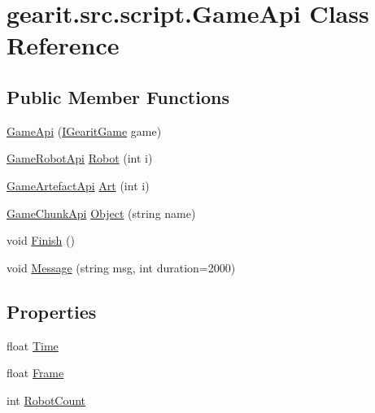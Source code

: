 \hypertarget{classgearit_1_1src_1_1script_1_1_game_api}{\section{gearit.\+src.\+script.\+Game\+Api Class Reference}
\label{classgearit_1_1src_1_1script_1_1_game_api}
}
\subsection*{Public Member Functions}
\begin{DoxyCompactItemize}
\item 
\hyperlink{classgearit_1_1src_1_1script_1_1_game_api_a703d982e6264255355aa6253338d5d1b}{Game\+Api} (\hyperlink{interfacegearit_1_1src_1_1game_1_1_i_gearit_game}{I\+Gearit\+Game} game)
\item 
\hyperlink{classgearit_1_1src_1_1script_1_1api_1_1game_1_1_game_robot_api}{Game\+Robot\+Api} \hyperlink{classgearit_1_1src_1_1script_1_1_game_api_a82b2e1c253998b657b15e65399f78828}{Robot} (int i)
\item 
\hyperlink{classgearit_1_1src_1_1script_1_1api_1_1game_1_1_game_artefact_api}{Game\+Artefact\+Api} \hyperlink{classgearit_1_1src_1_1script_1_1_game_api_a9350ddba654db554519b4f6fb45d6255}{Art} (int i)
\item 
\hyperlink{classgearit_1_1src_1_1script_1_1api_1_1game_1_1_game_chunk_api}{Game\+Chunk\+Api} \hyperlink{classgearit_1_1src_1_1script_1_1_game_api_ac85c011aa7df74768434f9a707b46d65}{Object} (string name)
\item 
void \hyperlink{classgearit_1_1src_1_1script_1_1_game_api_ac0d3d716bf903d0f0c3e3ba4c05a1bb3}{Finish} ()
\item 
void \hyperlink{classgearit_1_1src_1_1script_1_1_game_api_acd16b1ccf76c849cffc2b2c38e9af52e}{Message} (string msg, int duration=2000)
\end{DoxyCompactItemize}
\subsection*{Properties}
\begin{DoxyCompactItemize}
\item 
float \hyperlink{classgearit_1_1src_1_1script_1_1_game_api_a285fb90fb252459338255542d80bd144}{Time}
\item 
float \hyperlink{classgearit_1_1src_1_1script_1_1_game_api_af5db6ace21fae68628f334a5e6351198}{Frame}
\item 
int \hyperlink{classgearit_1_1src_1_1script_1_1_game_api_a91c29ec861456250febb94f04e86f4c4}{Robot\+Count}
\end{DoxyCompactItemize}


